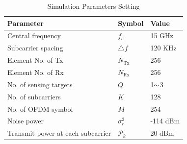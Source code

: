 \documentclass[9pt,final,journal,twocolumn]{IEEEtran}
\begin{document}
\begin{table}[!t] \label{tab:param}
\caption{Simulation Parameters Setting}
\begin{center}
  \begin{tabular}{p{5.0cm}|p{1.0cm}|p{1.5cm}}\hline\hline
  Parameter                          & Symbol               &  Value \\   \hline
  Central frequency                  & $f_c$                &  15 GHz \\   \hline
  Subcarrier spacing                 & $\triangle{f}$       &  120 KHz \\   \hline 
  Element No. of Tx                  & $N_{\mathrm{Tx}}$    &  256   \\   \hline  
  Element No. of Rx                  & $N_{\mathrm{Rx}}$    &  256        \\   \hline
  No. of sensing targets             & $Q$                  &  1$\thicksim$3   \\   \hline 
  No. of subcarriers                 & $K$                  &  128   \\   \hline 
  No. of OFDM symbol                 & $M$                  &  254   \\   \hline   
  Noise power                        & $\sigma_r^2$         &  -114 dBm \\     \hline  
  Transmit power at each subcarrier  & $\mathcal{P}_k$      &  20 dBm \\   \hline  
  \end{tabular}
\end{center}
\end{table}

\vspace{-0.2cm}
\end{document}
